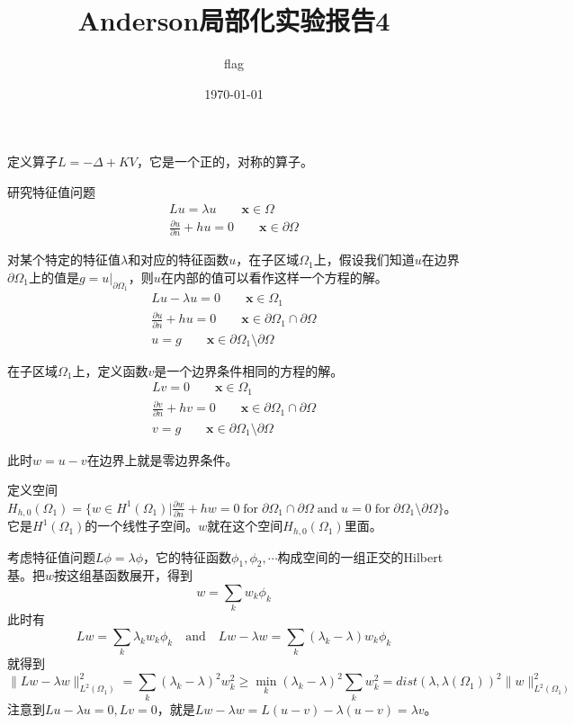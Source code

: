 \documentclass[UTF8,12pt]{article}
\title{Anderson局部化实验报告4}
\author{flag}
\date{\today}
\begin{document}
    
\maketitle

定义算子$L = -\Delta + K V$，它是一个正的，对称的算子。

研究特征值问题
\begin{eqnarray}\label{e0}
L u = \lambda u \qquad \mathbf{x} \in \Omega \\
\frac{\partial u}{\partial n} + h u = 0 \qquad \mathbf{x} \in \partial \Omega
\end{eqnarray}

对某个特定的特征值$\lambda$和对应的特征函数$u$，在子区域$\Omega_1$上，假设我们知道$u$在边界$\partial \Omega_1$上的值是$g = u|_{\partial \Omega_1}$，则$u$在内部的值可以看作这样一个方程的解。
\begin{eqnarray}
L u - \lambda u = 0 \qquad \mathbf{x} \in \Omega_1 \\
\frac{\partial u}{\partial n} + h u = 0 \qquad \mathbf{x} \in \partial \Omega_1 \cap \partial \Omega \\
u = g \qquad \mathbf{x} \in \partial \Omega_1 \setminus \partial \Omega
\end{eqnarray}

在子区域$\Omega_1$上，定义函数$v$是一个边界条件相同的方程的解。
\begin{eqnarray}
L v = 0 \qquad \mathbf{x} \in \Omega_1 \\
\frac{\partial v}{\partial n} + h v = 0 \qquad \mathbf{x} \in \partial \Omega_1 \cap \partial \Omega \\
v = g \qquad \mathbf{x} \in \partial \Omega_1 \setminus \partial \Omega
\end{eqnarray}

此时$w = u - v$在边界上就是零边界条件。

定义空间$H_{h,0}(\Omega_1) = \{ w \in H^1(\Omega_1) | \frac{\partial w}{\partial n} + h w = 0 \; \text{for} \; \partial \Omega_1 \cap \partial \Omega \; \text{and} \; u = 0 \; \text{for} \; \partial \Omega_1 \setminus \partial \Omega \}$。它是$H^1(\Omega_1)$的一个线性子空间。$w$就在这个空间$H_{h,0}(\Omega_1)$里面。

考虑特征值问题$L \phi = \lambda \phi$，它的特征函数$\phi_1, \phi_2, \cdots$构成空间的一组正交的Hilbert基。把$w$按这组基函数展开，得到
$$ w = \sum_k w_k \phi_k $$
此时有
$$ L w = \sum_k \lambda_k w_k \phi_k \quad \text{and} \quad L w - \lambda w = \sum_k (\lambda_k - \lambda) w_k \phi_k $$
就得到
$$ \| L w - \lambda w \|_{L^2(\Omega_1)}^2 = \sum_k (\lambda_k - \lambda)^2 w_k^2 \geq \min_k (\lambda_k - \lambda)^2\sum_k w_k^2 = dist(\lambda, \lambda
(\Omega_1))^2 \|w\|_{L^2(\Omega_1)}^2 $$
注意到$L u - \lambda u = 0, L v = 0$，就是$L w - \lambda w = L(u - v) - \lambda(u - v) = \lambda v$。
\end{document}
